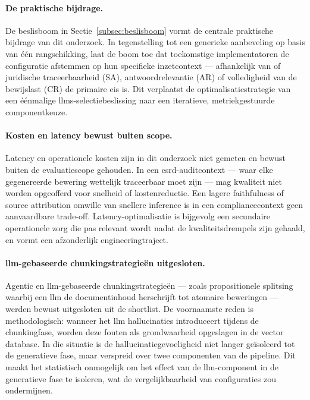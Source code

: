 \paragraph{De praktische bijdrage.}
De beslisboom in Sectie~\ref{subsec:beslisboom} vormt de centrale praktische bijdrage van dit onderzoek. In tegenstelling tot een generieke aanbeveling op basis van één rangschikking, laat de boom toe dat toekomstige implementatoren de configuratie afstemmen op hun specifieke inzetcontext — afhankelijk van of juridische traceerbaarheid (SA), antwoordrelevantie (AR) of volledigheid van de bewijslast (CR) de primaire eis is. Dit verplaatst de optimalisatiestrategie van een éénmalige \glspl{llm}-selectiebeslissing naar een iteratieve, metriekgestuurde componentkeuze.

\paragraph{Kosten en latency bewust buiten scope.}
Latency en operationele kosten zijn in dit onderzoek niet gemeten en bewust buiten de evaluatiescope gehouden. In een \gls{csrd}-auditcontext — waar elke gegenereerde bewering wettelijk traceerbaar moet zijn — mag kwaliteit niet worden opgeofferd voor snelheid of kostenreductie. Een lagere faithfulness of source attribution omwille van snellere inference is in een compliancecontext geen aanvaardbare trade-off. Latency-optimalisatie is bijgevolg een secundaire operationele zorg die pas relevant wordt nadat de kwaliteitsdrempels zijn gehaald, en vormt een afzonderlijk engineeringtraject.

\paragraph{\gls{llm}-gebaseerde chunkingstrategieën uitgesloten.}
Agentic en \gls{llm}-gebaseerde chunkingstrategieën — zoals propositionele splitsing waarbij een \gls{llm} de documentinhoud herschrijft tot atomaire beweringen — werden bewust uitgesloten uit de shortlist. De voornaamste reden is methodologisch: wanneer het \gls{llm} hallucinaties introduceert tijdens de chunkingfase, worden deze fouten als grondwaarheid opgeslagen in de vector database. In die situatie is de hallucinatiegevoeligheid niet langer geïsoleerd tot de generatieve fase, maar verspreid over twee componenten van de pipeline. Dit maakt het statistisch onmogelijk om het effect van de \gls{llm}-component in de generatieve fase te isoleren, wat de vergelijkbaarheid van configuraties zou ondermijnen.

